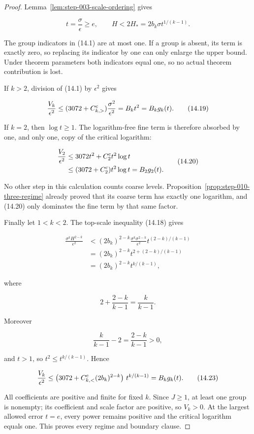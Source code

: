 \begin{proof}
Lemma~\ref{lem:step-003-scale-ordering} gives

\[
t=\frac{\sigma}{\epsilon}\geq e,
\qquad
H<2H_*=2b_k\sigma t^{1/(k-1)}.
\tag{14.18}
\]

The group indicators in (14.1) are at most one. If a group is absent, its
term is exactly zero, so replacing its indicator by one can only enlarge the
upper bound. Under theorem parameters both indicators equal one, so no actual
theorem contribution is lost.

If \(k>2\), division of (14.1) by \(\epsilon^2\) gives

\[
\frac{V_k}{\epsilon^2}
\leq(3072+C_{k,>}^{\rm c})\frac{\sigma^2}{\epsilon^2}
=B_kt^2
=B_kg_k(t).
\tag{14.19}
\]

If \(k=2\), then \(\log t\geq1\). The logarithm-free fine term is therefore
absorbed by one, and only one, copy of the critical logarithm:

\[
\begin{aligned}
\frac{V_2}{\epsilon^2}
&\leq3072t^2+C_2^{\rm c}t^2\log t\\
&\leq(3072+C_2^{\rm c})t^2\log t
=B_2g_2(t).
\end{aligned}
\tag{14.20}
\]

No other step in this calculation counts coarse levels. Proposition~\ref{prop:step-010-three-regime}
already proved that its coarse term has exactly one logarithm, and (14.20)
only dominates the fine term by that same factor.

Finally let \(1<k<2\). The top-scale inequality (14.18) gives

\[
\begin{aligned}
\frac{\sigma^kH^{2-k}}{\epsilon^2}
&<(2b_k)^{2-k}
\frac{\sigma^k\sigma^{2-k}}{\epsilon^2}
t^{(2-k)/(k-1)}\\
&=(2b_k)^{2-k}
t^{2+(2-k)/(k-1)}\\
&=(2b_k)^{2-k}t^{k/(k-1)},
\end{aligned}
\tag{14.21}
\]

where

\[
2+\frac{2-k}{k-1}=\frac{k}{k-1}.
\tag{14.22}
\]

Moreover

\[
\frac{k}{k-1}-2=\frac{2-k}{k-1}>0,
\]

and \(t>1\), so \(t^2\leq t^{k/(k-1)}\). Hence

\[
\frac{V_k}{\epsilon^2}
\leq\left(3072+C_{k,<}^{\rm c}(2b_k)^{2-k}\right)
\,t^{k/(k-1)}
=B_kg_k(t).
\tag{14.23}
\]

All coefficients are positive and finite for fixed \(k\). Since \(J\geq1\),
at least one group is nonempty; its coefficient and scale factor are
positive, so \(V_k>0\). At the largest allowed error \(t=e\), every power
remains positive and the critical logarithm equals one. This proves every
regime and boundary clause.
\end{proof}

